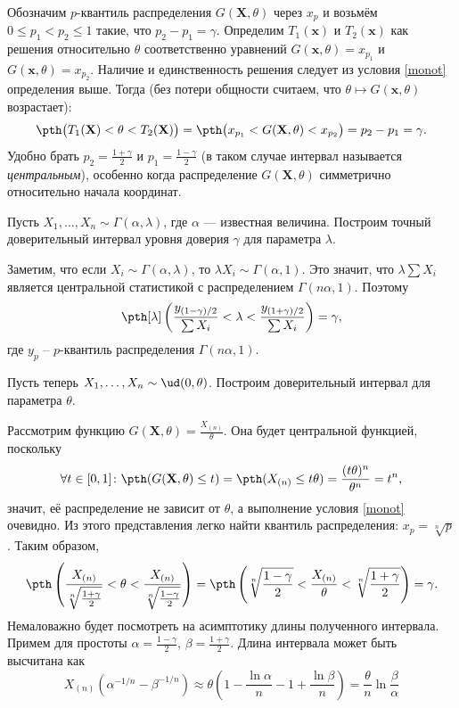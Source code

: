 Обозначим $p$-квантиль распределения $G(\mathbf X, \theta)$ через $x_p$ и возьмём $0 \le p_1 < p_2 \le 1$ такие, что $p_2 - p_1 =\gamma$. Определим $T_1(\mathbf{x})$ и $T_2(\mathbf{x})$ как решения относительно $\theta$ соответственно уравнений $G(\mathbf{x},\theta) = x_{p_1}$ и $G(\mathbf{x},\theta) = x_{p_2}$. Наличие и единственность решения следует из условия \ref{monot} определения выше. Тогда (без потери общности считаем, что $\theta \mapsto G(\mathbf{x}, \theta)$ возрастает):
\[
\pth\bigl(T_1(\mathbf X) < \theta < T_2(\mathbf X)\bigr) = \pth\bigl(x_{p_1} < G(\mathbf X, \theta) < x_{p_2}\bigr) = p_2 - p_1 = \gamma.
\]
Удобно брать $p_2 = \frac{1+\gamma}{2}$ и $p_1 = \frac{1-\gamma}{2}$ (в таком случае интервал называется \textit{центральным}), особенно когда распределение $G(\mathbf X, \theta)$ симметрично относительно начала координат.

\begin{example}
    Пусть $X_1, \ldots, X_n \sim \Gamma(\alpha, \lambda)$, где $\alpha$ --- известная величина. Построим точный доверительный интервал уровня доверия $\gamma$ для параметра $\lambda$.
    
    Заметим, что если $X_i \sim \Gamma(\alpha, \lambda)$, то $\lambda X_i \sim \Gamma(\alpha, 1)$. Это значит, что $\lambda\sum X_i$ является центральной статистикой с распределением $\Gamma(n\alpha, 1)$. Поэтому 
    \[
    \pth[\lambda]\left(\frac{y_{(1-\gamma)/2}}{\sum X_i} < \lambda < \frac{y_{(1+\gamma)/2}}{\sum X_i}\right) = \gamma,
    \]
    где $y_p$ -- $p$-квантиль распределения $\Gamma(n\alpha, 1)$.
\end{example}

\begin{example}\label{ci_for_ud}
    Пусть теперь $X_1, \ldots, X_n \sim \ud(0, \theta)$. Построим доверительный интервал для параметра $\theta$.
    
    Рассмотрим функцию $G(\mathbf X, \theta) = \frac{X_{(n)}}{\theta}$. Она будет центральной функцией, поскольку
    \[
    \forall t\in[0, 1]\colon \pth(G(\mathbf X, \theta) \le t) = \pth(X_{(n)} \le t\theta) = \frac{(t\theta)^n}{\theta^n} = t^n,
    \]
    значит, её распределение не зависит от $\theta$, а выполнение условия \ref{monot} очевидно. Из этого представления легко найти квантиль распределения: $x_p = \sqrt[n]{p}$. Таким образом,
    \[
    \pth\left(\frac{X_{(n)}}{\sqrt[n]{\frac{1+\gamma}{2}}} < \theta < \frac{X_{(n)}}{\sqrt[n]{\frac{1-\gamma}{2}}}\right) = \pth\left(\sqrt[n]{\frac{1-\gamma}{2}} < \frac{X_{(n)}}{\theta} < \sqrt[n]{\frac{1+\gamma}{2}}\right) = \gamma.
    \]
    Немаловажно будет посмотреть на асимптотику длины полученного интервала. Примем для простоты $\alpha = \frac{1-\gamma}{2}$, $\beta = \frac{1 + \gamma}{2}$. Длина интервала может быть высчитана как 
    \[
    X_{(n)}(\alpha^{-1/n} - \beta^{-1/n}) \approx \theta \left(1 - \frac{\ln{\alpha}}{n} - 1 + \frac{\ln{\beta}}{n}\right) = \frac{\theta}{n} \ln{\frac{\beta}{\alpha}}
    \]
\end{example}

